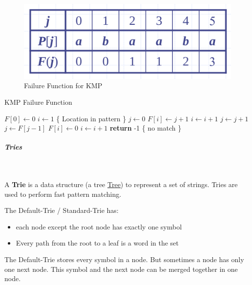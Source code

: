 \documentclass[11pt,twoside,twocolumn,landscape]{article}
\begin{document}
\begin{figure}[htbp]
\centering
\includegraphics[width=.9\linewidth]{img/kmp_failure_function.png}
\caption{\label{fig:org0edff7b}Failure Function for KMP}
\end{figure}


\begin{algorithm}
  \caption{KMP Failure Function}
  \begin{algorithmic}[1]
    \State $F[0] \leftarrow 0$
    \State $i \leftarrow 1$ \{ Location in pattern \}
    \State $j \leftarrow 0$ 
    \State $F[i] \leftarrow  j + 1$
    \State $i \leftarrow i + 1$
    \State $j \leftarrow j + 1$
    \State $j \leftarrow F[j-1]$
    \Else
    \State $F[i] \leftarrow 0$
    \State $i \leftarrow i + 1$
    \EndIf
    \EndWhile
    \textbf{return} -1 \{ no match \}
    \EndProcedure
  \end{algorithmic}
\end{algorithm}

\subparagraph{Tries} \
\label{sec:orgeab324a}

A \textbf{Trie} is a data structure (a tree \href{../../../roam/20210806224741-tree.org}{Tree}) to represent a set of strings.
Tries are used to perform fast pattern matching.


The Default-Trie / Standard-Trie has:
\begin{itemize}
\item each node except the root node has exactly one symbol
\item Every path from the root to a leaf is a word in the set
\end{itemize}


The Default-Trie stores every symbol in a node.
But sometimes a node has only one next node.
This symbol and the next node can be merged together in one node.
\end{document}

